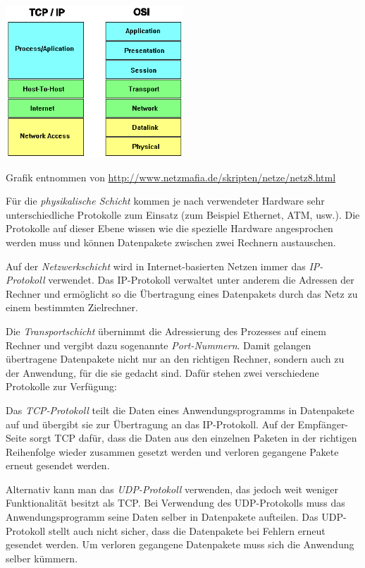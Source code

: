 \begin{center}
\includegraphics[width=0.5\textwidth]{./inf/SEKII/42_Netzwerke/tcpipiso.png}

Grafik entnommen von \url{http://www.netzmafia.de/skripten/netze/netz8.html}
\end{center}

Für die \emph{physikalische Schicht} kommen je nach verwendeter Hardware sehr
unterschiedliche Protokolle zum Einsatz (zum Beispiel Ethernet, ATM, usw.). Die
Protokolle auf dieser Ebene wissen wie die spezielle Hardware angesprochen
werden muss und können Datenpakete zwischen zwei Rechnern austauschen.

Auf der \emph{Netzwerkschicht} wird in Internet-basierten Netzen immer das
\emph{IP-Protokoll} verwendet. Das IP-Protokoll verwaltet unter anderem die
Adressen der Rechner und ermöglicht so die Übertragung eines Datenpakets durch
das Netz zu einem bestimmten Zielrechner.

Die \emph{Transportschicht} übernimmt die Adressierung des Prozesses auf einem
Rechner und vergibt dazu sogenannte \emph{Port-Nummern}. Damit gelangen
übertragene Datenpakete nicht nur an den richtigen Rechner, sondern auch zu der
Anwendung, für die sie gedacht sind. Dafür stehen zwei verschiedene Protokolle
zur Verfügung:

\begin{compactitem}
\item Das \emph{TCP-Protokoll} teilt die Daten eines Anwendungsprogramms in
Datenpakete auf und übergibt sie zur Übertragung an das IP-Protokoll. Auf der
Empfänger-Seite sorgt TCP dafür, dass die Daten aus den einzelnen Paketen in
der richtigen Reihenfolge wieder zusammen gesetzt werden und verloren gegangene
Pakete erneut gesendet werden. 
\item Alternativ kann man das \emph{UDP-Protokoll} verwenden, das jedoch weit
weniger Funktionalität besitzt als TCP. Bei Verwendung des UDP-Protokolls muss
das Anwendungsprogramm seine Daten selber in Datenpakete aufteilen. Das
UDP-Protokoll stellt auch nicht sicher, dass die Datenpakete bei Fehlern erneut
gesendet werden. Um verloren gegangene Datenpakete muss sich die Anwendung
selber kümmern.
\end{compactitem}

